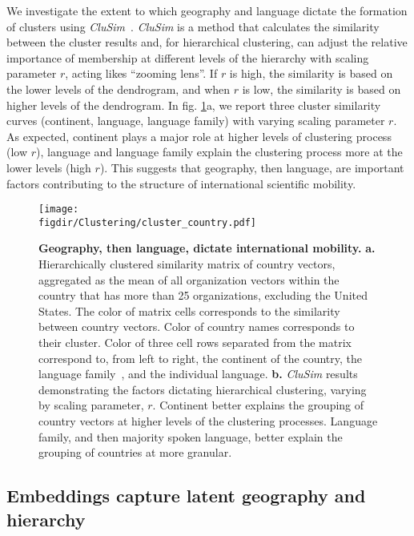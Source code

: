 \documentclass[12pt]{article} %
\def\figdir{../Figs}
\begin{document}
We investigate the extent to which geography and language dictate the formation of clusters using \textit{CluSim}~\autocite{gates2019element}.
\textit{CluSim} is a method that calculates the similarity between the cluster results and, for hierarchical clustering, can adjust the relative importance of membership at different levels of the hierarchy with scaling parameter $r$, acting likes ``zooming lens''.  
If $r$ is high, the similarity is based on the lower levels of the dendrogram, and when $r$ is low, the similarity is based on higher levels of the dendrogram. 
In fig. \ref{fig:clustering}a, we report three cluster similarity curves (continent, language, language family) with varying scaling parameter $r$.
As expected, continent plays a major role at higher levels of clustering process (low $r$), language and language family explain the clustering process more at the lower levels (high $r$). 
This suggests that geography, then language, are important factors contributing to the structure of international scientific mobility.

%
%
\begin{figure}[p!]
    \centering
    \label{fig:clustering}
    \texttt{[image: \\figdir/Clustering/cluster\_country.pdf]}
    \caption{
        \textbf{Geography, then language, dictate international mobility.}
        \textbf{a.} Hierarchically clustered similarity matrix of country vectors, aggregated as the mean of all organization vectors within the country that has more than 25 organizations, excluding the United States. 
        The color of matrix cells corresponds to the similarity between country vectors.
        Color of country names corresponds to their cluster.
        Color of three cell rows separated from the matrix correspond to, from left to right, the continent of the country, the language family~\autocite{ethnologue}, and the individual language. 
        \textbf{b.}    \textit{CluSim} \autocite{gates2019element} results demonstrating the factors dictating hierarchical clustering, varying by scaling parameter, $r$. 
        Continent better explains the grouping of country vectors at higher levels of the clustering processes.
        Language family, and then majority spoken language, better explain the grouping of countries at more granular. 
    }
\end{figure}


%
% 
\subsection*{Embeddings capture latent geography and hierarchy}
\end{document}
